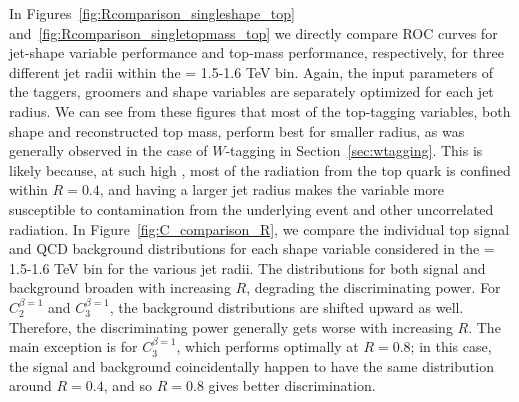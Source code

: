 In Figures~\ref{fig:Rcomparison_singleshape_top} and~\ref{fig:Rcomparison_singletopmass_top} we directly compare ROC curves for jet-shape variable performance and top-mass performance, respectively, for three different jet radii  within the \pt = 1.5-1.6 TeV bin. Again, the input parameters of the taggers, groomers and shape variables are separately optimized for each jet radius. We can see from these figures that most of the top-tagging variables, both shape and reconstructed top mass, perform best for smaller radius, as was generally observed in the case of $W$-tagging in Section~\ref{sec:wtagging}. This is likely because, at such high \pt, most of the radiation from the top quark is confined within $R=0.4$, and having a larger jet radius makes the variable more susceptible to contamination from the underlying event and other uncorrelated radiation. In Figure~\ref{fig:C_comparison_R}, we compare the individual top signal and QCD background distributions for each shape variable considered in the \pt = 1.5-1.6 TeV bin for the various jet radii. The distributions for both signal and background broaden with increasing $R$, degrading the discriminating power. For $C_2^{\beta=1}$ and $C_3^{\beta=1}$, the background distributions are shifted upward as well. Therefore, the discriminating power generally gets worse with increasing $R$. The main exception is   for $C_3^{\beta=1}$, which performs optimally at $R=0.8$; in this case, the signal and background coincidentally happen to have the same distribution around $R=0.4$, and so $R=0.8$ gives better discrimination.



